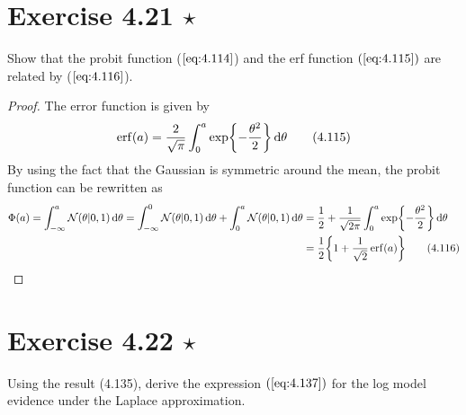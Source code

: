 \section*{Exercise 4.21 $\star$}
Show that the probit function ($\ref{eq:4.114}$) and the erf function $(\ref{eq:4.115})$ are
related by ($\ref{eq:4.116}$).

\vspace{1em}

\begin{proof}
    The error function is given by
    \begin{equation*}
        \erf(a) = \frac{2}{\sqrt{\pi}} \int_{0}^{a} \exp{-\frac{\theta^2}{2}} \diff \theta
        \tag{4.115}\label{eq:4.115}
    \end{equation*}
    By using the fact that the Gaussian is symmetric around the mean, 
    the probit function can be rewritten as
    \begin{align*}
        \Phi(a) 
        = \int_{-\infty}^{a} \mathcal{N}(\theta | 0, 1) \diff \theta
        = \int_{-\infty}^{0} \mathcal{N}(\theta | 0, 1) \diff \theta
        + \int_{0}^{a} \mathcal{N}(\theta | 0, 1) \diff \theta
        &= \frac{1}{2} + \frac{1}{\sqrt{2\pi}} \int_{0}^{a} \exp{-\frac{\theta^2}{2}} \diff \theta \\
        &= \frac{1}{2} \bigg\{1 + \frac{1}{\sqrt{2}} \erf(a)\bigg\} \tag{4.116}\label{eq:4.116}
    \end{align*}
\end{proof}

\section*{Exercise 4.22 $\star$}
Using the result (4.135), derive the expression
$(\ref{eq:4.137})$ for the log model evidence under the Laplace
approximation.

\vspace{1em}

